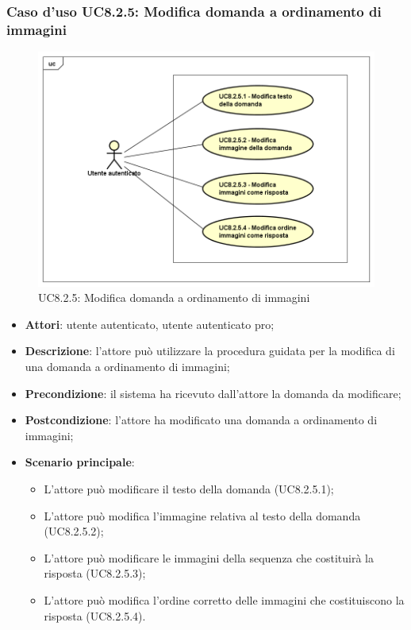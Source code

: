 \subsubsection{Caso d'uso UC8.2.5: Modifica domanda a ordinamento di immagini}
\label{UC8.2.5}
	\begin{figure}[h]
		\centering
			\includegraphics[scale=0.45,keepaspectratio]{UML/UC8_2_5.png}
		\caption{UC8.2.5: Modifica domanda a ordinamento di immagini}
	\end{figure}
\begin{itemize}
	\item\textbf{Attori}: utente autenticato, utente autenticato pro;
	\item\textbf{Descrizione}: l'attore può utilizzare la procedura guidata per la modifica di una domanda a ordinamento di immagini;
	\item\textbf{Precondizione}: il sistema ha ricevuto dall'attore la domanda da modificare; 
	\item \textbf{Postcondizione}: l'attore ha modificato una domanda a ordinamento di immagini;
	\item\textbf{Scenario principale}: 
	\begin{itemize}
		\item L'attore può modificare il testo della domanda (UC8.2.5.1);
		\item L'attore può modifica l'immagine relativa al testo della domanda (UC8.2.5.2);
		\item L'attore può modificare le immagini della sequenza che costituirà la risposta (UC8.2.5.3);
		\item L'attore può modifica l'ordine corretto delle immagini che costituiscono la risposta (UC8.2.5.4).
	\end{itemize}
\end{itemize}

